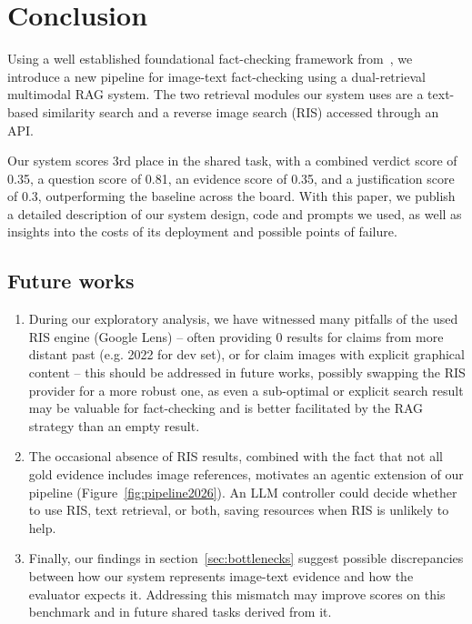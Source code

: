 
\section{Conclusion}
Using a well established foundational fact-checking framework from~\cite{ullrich-etal-2024-aic,ullrich-drchal-2025-aic}, we introduce a new pipeline for image-text fact-checking using a dual-retrieval multimodal RAG system.
The two retrieval modules our system uses are a text-based similarity search and a reverse image search (RIS) accessed through an API.

Our system scores 3rd place in the \averitec{} shared task, with a combined verdict score of 0.35, a question score of 0.81, an evidence score of 0.35, and a justification score of 0.3, outperforming the baseline across the board.
With this paper, we publish a detailed description of our system design, code and prompts we used, as well as insights into the costs of its deployment and possible points of failure.
\subsection{Future works}
\label{sec:future}
\begin{enumerate}
\item During our exploratory analysis, we have witnessed many pitfalls of the used RIS engine (Google Lens) -- often providing 0 results for claims from more distant past (e.g. 2022 for dev set), or for claim images with explicit graphical content -- this should be addressed in future works, possibly swapping the RIS provider for a more robust one, as even a sub-optimal or explicit search result may be valuable for fact-checking and is better facilitated by the RAG strategy than an empty result.
\item The occasional absence of RIS results, combined with the fact that not all gold evidence includes image references, motivates an agentic extension of our pipeline (Figure~\ref{fig:pipeline2026}). An LLM controller could decide whether to use RIS, text retrieval, or both, saving resources when RIS is unlikely to help.
\item Finally, our findings in section~\ref{sec:bottlenecks} suggest possible discrepancies between how our system represents image-text evidence and how the \averitec{} evaluator expects it. Addressing this mismatch may improve scores on this benchmark and in future shared tasks derived from it.
\end{enumerate}

